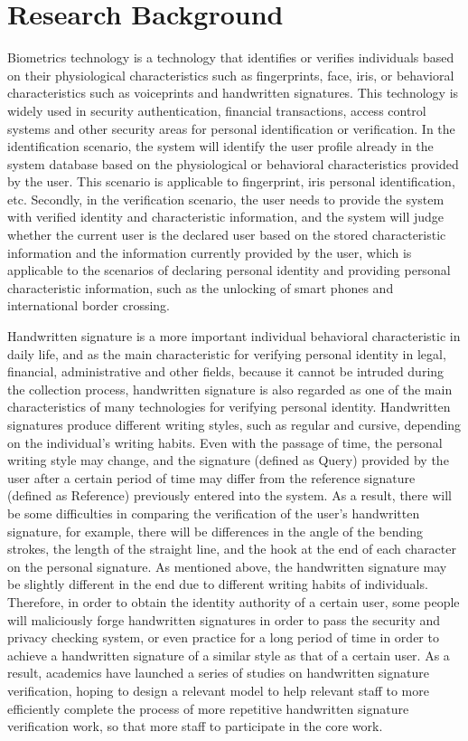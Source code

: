 \section{Research Background}

Biometrics technology is a technology that identifies or verifies individuals based on their physiological characteristics such as fingerprints, face, iris, or behavioral characteristics such as voiceprints and handwritten signatures. This technology is widely used in security authentication, financial transactions, access control systems and other security areas \cite{12} for personal identification or verification. In the identification scenario, the system will identify the user profile already in the system database based on the physiological or behavioral characteristics provided by the user. This scenario is applicable to fingerprint, iris personal identification, etc. Secondly, in the verification scenario, the user needs to provide the system with verified identity and characteristic information, and the system will judge whether the current user is the declared user based on the stored characteristic information and the information currently provided by the user, which is applicable to the scenarios of declaring personal identity and providing personal characteristic information, such as the unlocking of smart phones and international border crossing.

Handwritten signature is a more important individual behavioral characteristic in daily life, and as the main characteristic for verifying personal identity in legal, financial, administrative and other fields, because it cannot be intruded during the collection process, handwritten signature is also regarded as one of the main characteristics of many technologies for verifying personal identity. Handwritten signatures produce different writing styles, such as regular and cursive, depending on the individual's writing habits. Even with the passage of time, the personal writing style may change, and the signature (defined as Query) provided by the user after a certain period of time may differ from the reference signature (defined as Reference) previously entered into the system. As a result, there will be some difficulties in comparing the verification of the user's handwritten signature, for example, there will be differences in the angle of the bending strokes, the length of the straight line, and the hook at the end of each character on the personal signature. As mentioned above, the handwritten signature may be slightly different in the end due to different writing habits of individuals. Therefore, in order to obtain the identity authority of a certain user, some people will maliciously forge handwritten signatures in order to pass the security and privacy checking system, or even practice for a long period of time in order to achieve a handwritten signature of a similar style as that of a certain user. As a result, academics have launched a series of studies on handwritten signature verification, hoping to design a relevant model to help relevant staff to more efficiently complete the process of more repetitive handwritten signature verification work, so that more staff to participate in the core work.

